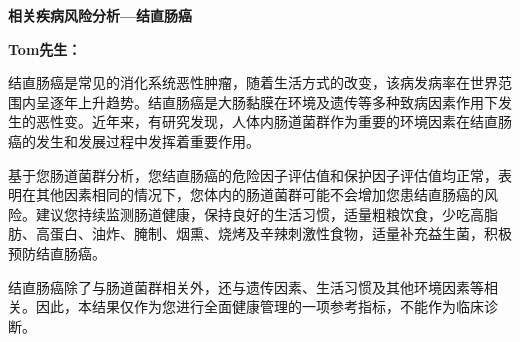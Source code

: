 \bigskip
{}
\newpage

\setlength{\arrayrulewidth}{0.5pt}
\fontsize{9.3pt}{17pt}\selectfont
\color{gray2}

\vspace*{0mm}
\begin{center}
{\bf\sanhao 相关疾病风险分析—结直肠癌}
\end{center}

\medskip

\noindent
{\bf\xiaosihao Tom先生：}


\bigskip
结直肠癌是常见的消化系统恶性肿瘤，随着生活方式的改变，该病发病率在世界范围内呈逐年上升趋势。结直肠癌是大肠黏膜在环境及遗传等多种致病因素作用下发生的恶性变。近年来，有研究发现，人体内肠道菌群作为重要的环境因素在结直肠癌的发生和发展过程中发挥着重要作用。

基于您肠道菌群分析，您结直肠癌的危险因子评估值和保护因子评估值均正常，表明在其他因素相同的情况下，您体内的肠道菌群可能不会增加您患结直肠癌的风险。建议您持续监测肠道健康，保持良好的生活习惯，适量粗粮饮食，少吃高脂肪、高蛋白、油炸、腌制、烟熏、烧烤及辛辣刺激性食物，适量补充益生菌，积极预防结直肠癌。

结直肠癌除了与肠道菌群相关外，还与遗传因素、生活习惯及其他环境因素等相关。因此，本结果仅作为您进行全面健康管理的一项参考指标，不能作为临床诊断。

